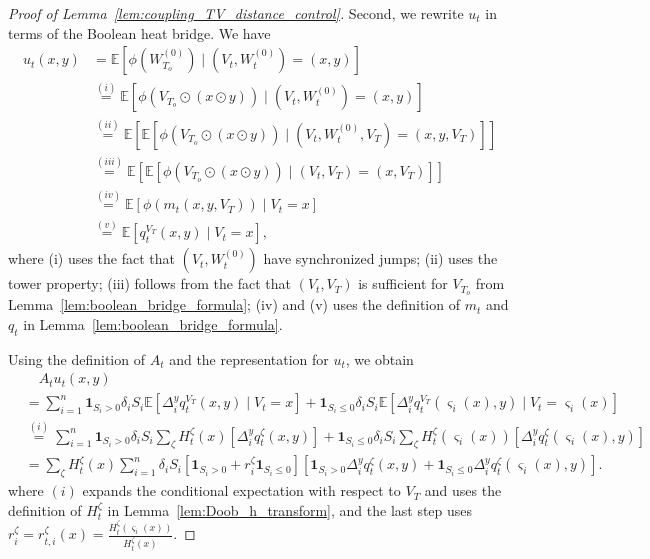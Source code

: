 \documentclass[11pt]{article}
\newcommand{\flip}{\varsigma}
\newcommand{\uV}{V}
\newcommand{\uW}{W}
\newcommand{\To}{{T_o}}
\theoremstyle{named}
\theoremstyle{plain}
\newcommand{\Exs}{\ensuremath{{\mathbb{E}}}}
\newcommand{\brackets}[1]{\left[ #1 \right]}
\begin{document}
\begin{proof}[Proof of Lemma~\ref{lem:coupling_TV_distance_control}]
  Second, we rewrite $u_t$ in terms of the Boolean heat bridge. We have
  \begin{align*}
    u_t(x, y) &= \Exs[\phi(\uW_{\To}^{(0)}) \mid (\uV_t, \uW_t^{(0)}) = (x, y)] \\
    &\overset{(i)}{=} \Exs[\phi(\uV_{\To} \odot (x \odot y)) \mid (\uV_t, \uW_t^{(0)}) = (x, y)] \\
    &\overset{(ii)}{=} \Exs\brackets{ \Exs[\phi(\uV_{\To} \odot (x \odot y)) \mid (\uV_t, \uW_t^{(0)}, \uV_{T}) = (x, y, \uV_{T}) ] } \\
    &\overset{(iii)}{=} \Exs\brackets{ \Exs[\phi(\uV_{\To} \odot (x \odot y)) \mid (\uV_t, \uV_{T}) = (x, \uV_{T}) ] } \\
    &\overset{(iv)}{=} \Exs[\phi(m_{t}(x, y, \uV_{T})) \mid \uV_t = x] \\
    &\overset{(v)}{=} \Exs[q_t^{\uV_{T}}(x, y) \mid \uV_t = x],
  \end{align*}
  where (i) uses the fact that $(\uV_t, \uW_t^{(0)})$ have synchronized jumps; (ii) uses the tower property; (iii) follows from the fact that $(\uV_t, \uV_T)$ is sufficient for $\uV_{\To}$ from Lemma~\ref{lem:boolean_bridge_formula}; (iv) and (v) uses the definition of $m_t$ and $q_t$ in Lemma~\ref{lem:boolean_bridge_formula}. 

  Using the definition of $A_t$ and the representation for $u_t$, we obtain
  \begin{align*}
     &\quad A_t u_t(x, y) \\
     &= \sum_{i=1}^n  \mathbf{1}_{S_i > 0}  \delta_i  S_i \Exs\brackets{\Delta_i^y q_t^{\uV_T}(x, y) \mid \uV_t = x} + \mathbf{1}_{S_i \leq 0} \delta_i  S_i \Exs\brackets{\Delta_i^y q_t^{\uV_T}(\flip_i(x), y) \mid \uV_t = \flip_i(x)} \\
     &\overset{(i)}{=} \sum_{i=1}^n  \mathbf{1}_{S_i > 0}  \delta_i  S_i \sum_{\zeta} H_{t}^{\zeta}(x) \brackets{\Delta_i^y q_t^{\zeta}(x, y)} + \mathbf{1}_{S_i \leq 0} \delta_i  S_i \sum_{\zeta} H_t^{\zeta}(\flip_i(x))\brackets{\Delta_i^y q_t^{\zeta}(\flip_i(x), y)} \\
     &= \sum_{\zeta} H_{t}^{\zeta}(x) \sum_{i=1}^n \delta_i S_i \brackets{\mathbf{1}_{S_i > 0} + r_i^{\zeta} \mathbf{1}_{S_i \leq 0} } \brackets{\mathbf{1}_{S_i > 0} \Delta_i^y q_t^{\zeta}(x, y) + \mathbf{1}_{S_i \leq 0} \Delta_i^y q_t^{\zeta}(\flip_i(x), y)}.
  \end{align*}
  where $(i)$ expands the conditional expectation with respect to $\uV_T$ and uses the definition of $H_t^{\zeta}$ in Lemma~\ref{lem:Doob_h_transform}, and the last step uses $r_i^{\zeta} = r_{t, i}^{\zeta}(x) = \frac{H_t^{\zeta}(\flip_i(x))}{H_t^{\zeta}(x)}$. 


\end{proof}
\end{document}
